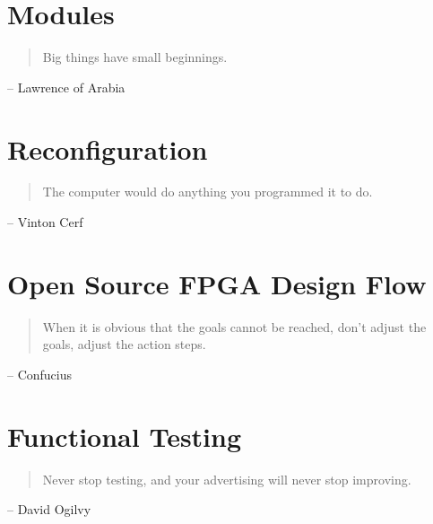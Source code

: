 \documentclass[12pt, final]{ucthesis}
\begin{document}
\begin{dissertationText}
\chapter{Modules														%
    \label{chap:mod}}                
				\begin{quote}
        Big things have small beginnings.
        \end{quote}
            \begin{flushright}
             -- Lawrence of Arabia
            \end{flushright}
    

\chapter{Reconfiguration              			%
    \label{chap:reconfig}}                
				\begin{quote}
        The computer would do anything you programmed it to do.
        \end{quote}
            \begin{flushright}
            -- Vinton Cerf
            \end{flushright}
    

\chapter{Open Source FPGA Design Flow 			%
    \label{chap:flow}}                
				\begin{quote}
        When it is obvious that the goals cannot be reached, don't adjust the goals, adjust the action steps.
        \end{quote}
            \begin{flushright}
            -- Confucius
            \end{flushright}
    

\chapter{Functional Testing                 %
    \label{chap:testing}}                
				\begin{quote}
        Never stop testing, and your advertising will never stop improving.
        \end{quote}
            \begin{flushright}
            -- David Ogilvy
            \end{flushright}
    


\end{dissertationText}
\end{document}
